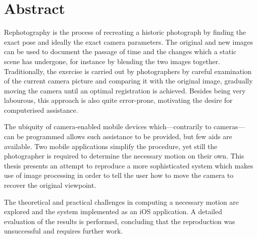 \chapter*{Abstract}

Rephotography is the process of recreating a historic photograph by finding the
exact pose and ideally the exact camera parameters. The original and new images
can be used to document the passage of time and the changes which a static scene
has undergone, for instance by blending the two images together. Traditionally,
the exercise is carried out by photographers by careful examination of the
current camera picture and comparing it with the original image, gradually
moving the camera until an optimal registration is achieved. Besides being very
labourous, this approach is also quite error-prone, motivating the desire for
computerised assistance.

The ubiquity of camera-enabled mobile devices which---contrarily to
cameras---can be programmed allows such assistance to be provided, but few aids
are available. Two mobile applications simplify the procedure, yet still the
photographer is required to determine the necessary motion on their own. This
thesis presents an attempt to reproduce a more sophisticated system which makes
use of image processing in order to tell the user how to move the camera to
recover the original viewpoint.

The theoretical and practical challenges in computing a necessary motion are
explored and the system implemented as an iOS application. A detailed
evaluation of the results is performed, concluding that the reproduction was
unsuccessful and requires further work.
